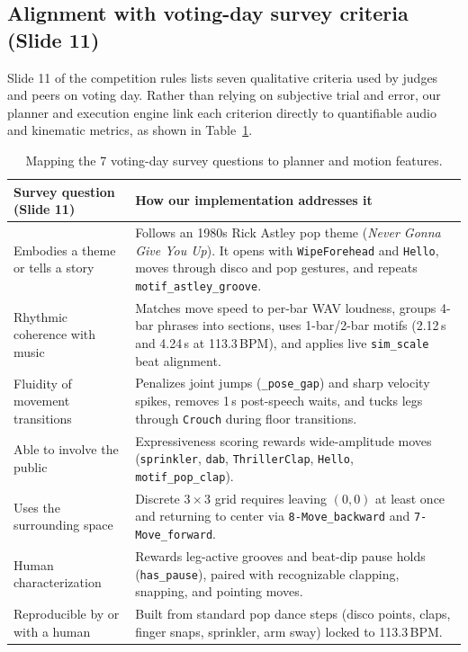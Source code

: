 \documentclass[11pt,a4paper]{article}
\newcommand{\code}[1]{\texttt{#1}}
\begin{document}
\clearpage

\subsection{Alignment with voting-day survey criteria (Slide 11)}

Slide 11 of the competition rules lists seven qualitative criteria used by judges and peers on voting day. Rather than relying on subjective trial and error, our planner and execution engine link each criterion directly to quantifiable audio and kinematic metrics, as shown in Table~\ref{tab:survey}.

\begin{table}[H]
  \centering
  \small
  \caption{Mapping the 7 voting-day survey questions to planner and motion features.}
  \label{tab:survey}
  \begin{tabularx}{\textwidth}{>{\raggedright\arraybackslash}p{4.3cm} X}
    \toprule
    \textbf{Survey question (Slide 11)} & \textbf{How our implementation addresses it} \\
    \midrule
    Embodies a theme or tells a story & Follows an 1980s Rick Astley pop theme (\emph{Never Gonna Give You Up}). It opens with \code{WipeForehead} and \code{Hello}, moves through disco and pop gestures, and repeats \code{motif\_astley\_groove}. \\
    Rhythmic coherence with music & Matches move speed to per-bar WAV loudness, groups 4-bar phrases into sections, uses 1-bar/2-bar motifs (2.12\,s and 4.24\,s at 113.3\,BPM), and applies live \code{sim\_scale} beat alignment. \\
    Fluidity of movement transitions & Penalizes joint jumps (\code{\_pose\_gap}) and sharp velocity spikes, removes 1\,s post-speech waits, and tucks legs through \code{Crouch} during floor transitions. \\
    Able to involve the public & Expressiveness scoring rewards wide-amplitude moves (\code{sprinkler}, \code{dab}, \code{ThrillerClap}, \code{Hello}, \code{motif\_pop\_clap}). \\
    Uses the surrounding space & Discrete $3\times 3$ grid requires leaving $(0,0)$ at least once and returning to center via \code{8-Move\_backward} and \code{7-Move\_forward}. \\
    Human characterization & Rewards leg-active grooves and beat-dip pause holds (\code{has\_pause}), paired with recognizable clapping, snapping, and pointing moves. \\
    Reproducible by or with a human & Built from standard pop dance steps (disco points, claps, finger snaps, sprinkler, arm sway) locked to 113.3\,BPM. \\
    \bottomrule
  \end{tabularx}
\end{table}
\end{document}
